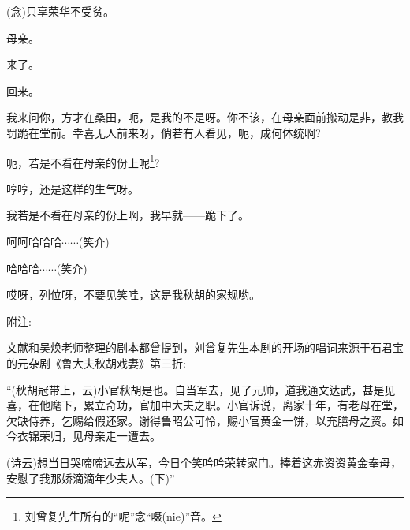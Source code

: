 {({\akai 念})只享荣华不受贫。

母亲。

来了。

回来。

我来问你，方才在桑田，呃，是我的不是呀。你不该，在母亲面前搬动是非，教我罚跪在堂前。幸喜无人前来呀，倘若有人看见，呃，成何体统啊?

呃，若是不看在母亲的份上呢\footnote{刘曾复先生所有的``呢''念``嗫(nie)''音。}?

哼哼，还是这样的生气呀。

我若是不看在母亲的份上啊，我早就------跪下了。

呵呵哈哈哈$\cdots{}\cdots{}$({\hwfs 笑介})

哈哈哈$\cdots{}\cdots{}$({\hwfs 笑介})

哎呀，列位呀，不要见笑哇，这是我秋胡的家规哟。
}

\vspace{10pt}
{\hei 附注}:~

文献\cite{Xu-MasterThesis}和吴焕老师整理的剧本都曾提到，刘曾复先生本剧的开场的唱词来源于石君宝的元杂剧《鲁大夫秋胡戏妻》第三折:~

``(秋胡{\hwfs 冠带上}，{\akai 云})小官秋胡是也。自当军去，见了元帅，道我通文达武，甚是见喜，在他麾下，累立奇功，官加中大夫之职。小官诉说，离家十年，有老母在堂，欠缺侍养，乞赐给假还家。谢得鲁昭公可怜，赐小官黄金一饼，以充膳母之资。如今衣锦荣归，见母亲走一遭去。

({\akai 诗云})想当日哭啼啼远去从军，今日个笑吟吟荣转家门。捧着这赤资资黄金奉母，安慰了我那娇滴滴年少夫人。({\hwfs 下})''
